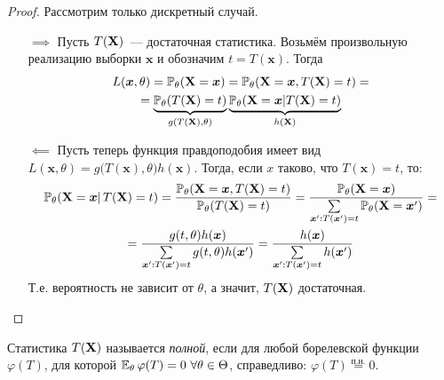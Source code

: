 \begin{proof}
    Рассмотрим только дискретный случай. 
    \begin{enumerate}
        \item[$\implies$] Пусть $T(\mathbf{X})$~--- достаточная статистика. 
            Возьмём произвольную реализацию выборки $\boldsymbol{x}$ и обозначим $t = T(\boldsymbol{x})$. Тогда
            \begin{multline*}
                L(\boldsymbol{x}, \theta) = \operatorname{\operatorname{\mathbb{P}}_{\theta}} (\mathbf{X}=\boldsymbol{x})=\operatorname{\operatorname{\mathbb{P}}_{\theta}} (\mathbf{X}=\boldsymbol{x}, T(\mathbf{X})=t) =\\
                = \underbrace{\operatorname{\operatorname{\mathbb{P}}_{\theta}} (T(\mathbf{X})=t)}_{g(T(\mathbf{X}), \theta)} \underbrace{\operatorname{\operatorname{\mathbb{P}}_{\theta}} (\mathbf{X}=\boldsymbol{x} | T(\mathbf{X})=t)}_{h(\mathbf{X})}
            \end{multline*}
        \item[$\impliedby$] Пусть теперь функция правдоподобия имеет вид $L(\boldsymbol{x}, \theta)=g\bigl(T(\boldsymbol{x}), \theta\bigr) h(\boldsymbol{x})$. 
            Тогда, если $x$ таково, что $T(\boldsymbol{x})=t$, то:
            \begin{multline*}
                \operatorname{\operatorname{\mathbb{P}}_{\theta}} (\mathbf{X}=\boldsymbol{x} | \, T(\mathbf{X})=t) =\frac{\operatorname{\operatorname{\mathbb{P}}_{\theta}} (\mathbf{X}=\boldsymbol{x}, T(\mathbf{X})=t)}{\operatorname{\operatorname{\mathbb{P}}_{\theta}} (T(\mathbf{X})=t)}
                =\frac{\operatorname{\operatorname{\mathbb{P}}_{\theta}} (\mathbf{X}=\boldsymbol{x})}{\sum\limits_{\boldsymbol{x}^{\prime}: T(\boldsymbol{x}^{\prime})=t} \operatorname{\operatorname{\mathbb{P}}_{\theta}}(\mathbf{X}=\boldsymbol{x}^{\prime})} = \\
                = \frac{g(t, \theta) h(\boldsymbol{x})}{\sum\limits_{\boldsymbol{x}^{\prime}: T(\boldsymbol{x}^{\prime})=t} g(t, \theta) h(\boldsymbol{x}^{\prime})}
                = \frac{h(\boldsymbol{x})}{\sum\limits_{\boldsymbol{x}^{\prime}: T(\boldsymbol{x}^{\prime})=t} h(\boldsymbol{x}^{\prime})}
            \end{multline*}
            Т.е. вероятность не зависит от $\theta$, а значит, $T(\mathbf{X})$ достаточная.
    \end{enumerate}
\end{proof}

\begin{defn}
    Статистика $T(\mathbf{X})$ называется \textit{полной}, если для любой борелевской функции $\varphi(T)$, для которой $\operatorname{\operatorname{\mathbb{E}}_{\theta}} \varphi(T)=0~\forall \theta \in \Theta$, справедливо: $\varphi(T) \stackrel{\text{п.н.}}{=}0$.
\end{defn}

